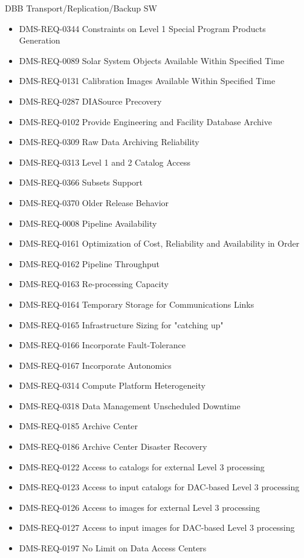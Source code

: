 DBB Transport/Replication/Backup SW \begin{itemize}
\item DMS-REQ-0344 Constraints on Level 1 Special Program Products Generation
\item DMS-REQ-0089 Solar System Objects Available Within Specified Time
\item DMS-REQ-0131 Calibration Images Available Within Specified Time
\item DMS-REQ-0287 DIASource Precovery
\item DMS-REQ-0102 Provide Engineering and Facility Database Archive
\item DMS-REQ-0309 Raw Data Archiving Reliability
\item DMS-REQ-0313 Level 1 and 2 Catalog Access
\item DMS-REQ-0366 Subsets Support
\item DMS-REQ-0370 Older Release Behavior
\item DMS-REQ-0008 Pipeline Availability
\item DMS-REQ-0161 Optimization of Cost, Reliability and Availability in Order
\item DMS-REQ-0162 Pipeline Throughput
\item DMS-REQ-0163 Re-processing Capacity
\item DMS-REQ-0164 Temporary Storage for Communications Links
\item DMS-REQ-0165 Infrastructure Sizing for "catching up"
\item DMS-REQ-0166 Incorporate Fault-Tolerance
\item DMS-REQ-0167 Incorporate Autonomics
\item DMS-REQ-0314 Compute Platform Heterogeneity
\item DMS-REQ-0318 Data Management Unscheduled Downtime
\item DMS-REQ-0185 Archive Center
\item DMS-REQ-0186 Archive Center Disaster Recovery
\item DMS-REQ-0122 Access to catalogs for external Level 3 processing
\item DMS-REQ-0123 Access to input catalogs for DAC-based Level 3 processing
\item DMS-REQ-0126 Access to images for external Level 3 processing
\item DMS-REQ-0127 Access to input images for DAC-based Level 3 processing
\item DMS-REQ-0197 No Limit on Data Access Centers
\end{itemize}
